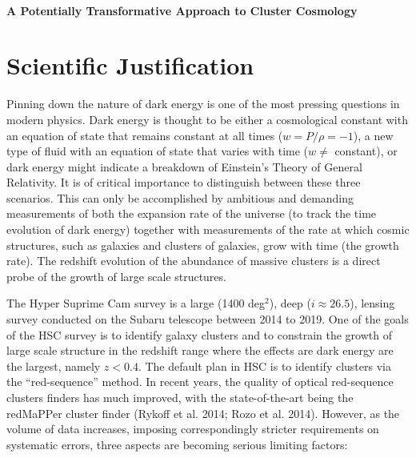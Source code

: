 \documentclass[letterpaper,12pt]{article}
\begin{document}
\\[-1cm]
\begin{center}
\bf\Large
A Potentially Transformative Approach to Cluster Cosmology 
\end{center}

\section{Scientific Justification} 

Pinning down the nature of dark energy is one of the most pressing questions in modern physics. Dark energy is thought
to be either a cosmological constant with an equation of state that remains constant at all times ($w=P/\rho=-1$), a
new type of fluid with an equation of state that varies with time ($w \neq$ constant), or dark energy might indicate a
breakdown of Einstein's Theory of General Relativity. It is of critical importance to distinguish between these three
scenarios. This can only be accomplished by ambitious and demanding measurements of both the expansion rate of the
universe (to track the time evolution of dark energy) together with measurements of the rate at which cosmic
structures, such as galaxies and clusters of galaxies, grow with time (the growth rate). The redshift evolution of
the abundance of massive clusters is a direct probe of the growth of large scale structures.

The Hyper Suprime Cam survey is a large (1400 deg$^2$), deep ($i\approx26.5$), lensing survey conducted on the Subaru
telescope between 2014 to 2019. One of the goals of the HSC survey is to identify galaxy clusters and to constrain
the growth of large scale structure in the redshift range where the effects are dark energy are the largest, namely
$z<0.4$. The default plan in HSC is to identify clusters via the  ``red-sequence'' method. In recent years, the
quality of optical red-sequence clusters finders has much improved, with the state-of-the-art being the redMaPPer
cluster finder (Rykoff et al. 2014; Rozo et al. 2014). However, as the volume of data increases, imposing
correspondingly stricter requirements on systematic errors, three aspects are becoming serious limiting factors:
\end{document}
